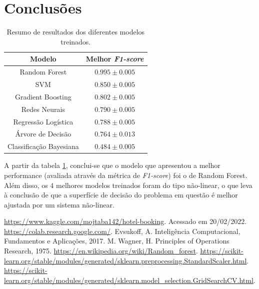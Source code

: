 \documentclass{homework}
\begin{document}
\section{Conclusões}

\begin{table}[h!]
    \centering
    \begin{tabular}{|c|c|}
        \hline
        \textbf{Modelo} & \textbf{Melhor \textit{F1-score}} \\
        \hline
        Random Forest & $0.995 \pm 0.005$ \\
        \hline
        SVM & $0.850 \pm 0.005$ \\
        \hline
        Gradient Boosting & $0.802 \pm 0.005$ \\
        \hline
        Redes Neurais & $0.790 \pm 0.005$ \\
        \hline
        Regressão Logística & $0.788 \pm 0.005$ \\
        \hline
        Árvore de Decisão & $0.764 \pm 0.013$ \\
        \hline
        Classificação Bayesiana & $0.484 \pm 0.005$ \\
        \hline
    \end{tabular}
    \caption{Resumo de resultados dos diferentes modelos treinados.}
    \label{compiled_results}
\end{table}

A partir da tabela \ref{compiled_results}, conclui-se que o modelo que apresentou a melhor performance (avaliada através
da métrica de \textit{F1-score}) foi o de Random Forest. Além disso, os 4 melhores modelos treinados foram do tipo
não-linear, o que leva à conclusão de que a superfície de decisão do problema em questão é melhor ajustada por um
sistema não-linear.

\begin{thebibliography}{1}
     \url{https://www.kaggle.com/mojtaba142/hotel-booking}. Acessado em 20/02/2022.
     \url{https://colab.research.google.com/}.
     Evsukoff, A. Inteligência Computacional, Fundamentos e Aplicações, 2017.
     M. Wagner, H. Principles of Operations Research, 1975.
     \url{https://en.wikipedia.org/wiki/Random_forest}.
     \url{https://scikit-learn.org/stable/modules/generated/sklearn.preprocessing.StandardScaler.html}.
     \url{https://scikit-learn.org/stable/modules/generated/sklearn.model_selection.GridSearchCV.html}.
\end{thebibliography}
\end{document}
